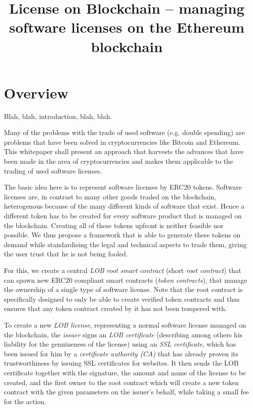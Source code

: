 \documentclass[a4paper]{article}
\title{License on Blockchain – managing software licenses on the Ethereum blockchain}
\begin{document}


\section{Overview}

Blah, blah, introduction, blah, blah.


Many of the problems with the trade of used software (e.g. double spending) are problems that have been solved in cryptocurrencies like Bitcoin and Ethereum. 
This whitepaper shall present an approach that harvests the advances that have been made in the area of cryptocurrencies and makes them applicable to the trading of used software licenses. 

The basic idea here is to represent software licenses by ERC20 \cite{erc20} tokens. Software licenses are, in contrast to many other goods traded on the blockchain, heterogenous because of the many different kinds of software that exist. Hence a different token has to be created for every software product that is managed on the blockchain. Creating all of these tokens upfront is neither feasible nor possible. We thus propose a framework that is able to generate these tokens on demand while standardising the legal and technical aspects to trade them, giving the user trust that he is not being fooled. 

For this, we create a central \emph{LOB root smart contract} (short \emph{root contract}) that can spawn new ERC20 compliant smart contracts (\emph{token contracts}), that manage the ownership of a single type of software license. Note that the root contract is specifically designed to only be able to create verified token contracts and thus ensures that any token contract created by it has not been tempered with.

To create a new \emph{LOB license}, representing a normal software license managed on the blockchain, the \emph{issuer} signs an \emph{LOB certificate} (describing among others his liability for the genuineness of the license) using an \emph{SSL certificate}, which has been issued for him by a \emph{certificate authority (CA)} that has already proven its trustworthiness by issuing SSL certificates for websites. It then sends the LOB certificate together with the signature, the amount and name of the license to be created, and the first owner to the root contract which will create a new token contract with the given parameters on the issuer's behalf, while taking a small fee for the action.
\end{document}
